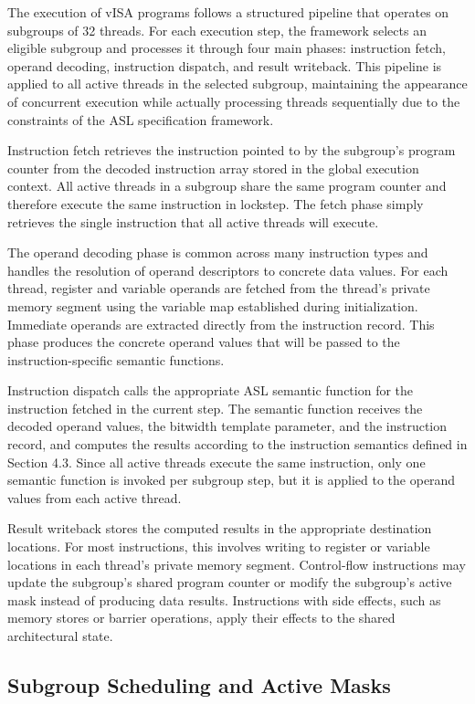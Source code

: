The execution of vISA programs follows a structured pipeline that operates on
subgroups of 32 threads. For each execution step, the framework selects an
eligible subgroup and processes it through four main phases: instruction fetch,
operand decoding, instruction dispatch, and result writeback. This pipeline is
applied to all active threads in the selected subgroup, maintaining the
appearance of concurrent execution while actually processing threads
sequentially due to the constraints of the ASL specification framework.

Instruction fetch retrieves the instruction pointed to by the subgroup's
program counter from the decoded instruction array stored in the global
execution context. All active threads in a subgroup share the same program
counter and therefore execute the same instruction in lockstep. The fetch phase
simply retrieves the single instruction that all active threads will execute.

The operand decoding phase is common across many instruction types and handles
the resolution of operand descriptors to concrete data values. For each thread,
register and variable operands are fetched from the thread's private memory
segment using the variable map established during initialization. Immediate
operands are extracted directly from the instruction record. This phase
produces the concrete operand values that will be passed to the
instruction-specific semantic functions.

Instruction dispatch calls the appropriate ASL semantic function for the
instruction fetched in the current step. The semantic function receives the
decoded operand values, the bitwidth template parameter, and the instruction
record, and computes the results according to the instruction semantics defined
in Section 4.3. Since all active threads execute the same instruction, only one
semantic function is invoked per subgroup step, but it is applied to the
operand values from each active thread.

Result writeback stores the computed results in the appropriate destination
locations. For most instructions, this involves writing to register or variable
locations in each thread's private memory segment. Control-flow instructions
may update the subgroup's shared program counter or modify the subgroup's
active mask instead of producing data results. Instructions with side effects,
such as memory stores or barrier operations, apply their effects to the shared
architectural state.

\subsection{Subgroup Scheduling and Active Masks}

